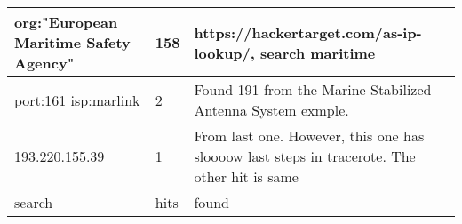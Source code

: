 \begin{table}[H]
\begin{tabular}{|l|l|l|}
org:"European Maritime Safety Agency" & 158 &  https://hackertarget.com/as-ip-lookup/, search maritime\\ \hline

port:161 isp:marlink & 2 & Found 191 from the Marine Stabilized Antenna System exmple. \\ \hline
193.220.155.39 & 1 &  From last one. However, this one has sloooow last steps in tracerote. The other hit is same\\ \hline

search & hits &  found\\ \hline
\end{tabular}
\end{table}


